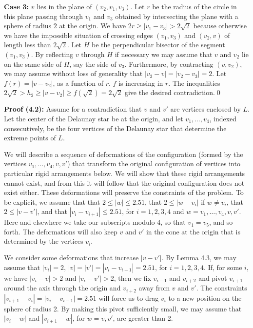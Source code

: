 {\bf Case 3:} $v$ lies in the plane of $(v_2,v_1,v_3)$.
Let $r$ be the radius of the circle in this plane passing
through $v_1$ and $v_3$ obtained by intersecting the plane
with a sphere of radius $2$ at the origin.  
We have $2r\ge|v_1-v_3|>2\sqrt{2}$ because otherwise we have the impossible
situation of crossing edges $(v_1,v_3)$ and
 $(v_2,v)$ of length less than $2\sqrt{2}$.
Let $H$ be the perpendicular bisector of
the segment $(v_1,v_3)$.
By reflecting $v$ through $H$ if necessary
we may assume that $v$ and $v_2$ lie
on the same side of $H$, say the side of $v_3$.  Furthermore,
by contracting $(v,v_2)$, we may assume
without loss of generality 
that $|v_3-v|=|v_2-v_3|=2$.  
Let $f(r)=|v-v_2|$,
as a function of $r$.  $f$ is increasing
in $r$.  The inequalities
$2\sqrt{2}>h_2\ge|v-v_2|\ge f(\sqrt{2})=2\sqrt{2}$
give the desired contradiction.\qed

{\bf Proof (4.2):}
Assume for a contradiction that $v$ and $v'$ are vertices enclosed
by $L$.  Let the center of the Delaunay star be at the origin,
and let $v_1,\ldots, v_4$, indexed
consecutively,  be the four vertices of the Delaunay
star  that determine the extreme points
of  $L$.

We will describe a sequence of
deformations of the configuration 
(formed by the vertices $v_1,\ldots,v_4,v,v'$) that
transform the original configuration of vertices into particular
rigid arrangements below.  We will show that these rigid arrangements
cannot exist, and from this it will follow that the original configuration
does not exist either.
These deformations will preserve the constraints of the problem.
To be explicit, we assume that
that $2\le|w|\le 2.51$,
that $2\le |w-v_i|$ if $w\ne v_i$,
that $2\le |v-v'|$,
and that $|v_i-v_{i+1}|\le 2.51$,
for $i=1,2,3,4$ and $w=v_1,\ldots,v_4,v,v'$.
Here and
elsewhere we take our subscripts modulo 4, so that $v_1=v_5$, and
so forth.  The deformations will also keep $v$ and $v'$
in the cone at the origin that is determined by the
vertices $v_i$.  

We consider some deformations that increase $|v-v'|$.  
By Lemma 4.3, we may assume that
$|v_i|=2$,
$|v|=|v'|=|v_i-v_{i+1}|=2.51$, for $i=1,2,3,4$.
If, for some $i$,
we have $|v_i-v|>2$ and $|v_i-v'|>2$, then we fix $v_{i-1}$ and
$v_{i+2}$ and pivot $v_{i+1}$ around the axis through the origin and $v_{i+2}$
away from $v$ and $v'$.  The constraints $|v_{i+1}-v_i|=|v_i-v_{i-1}|=2.51$
will force us to drag $v_i$ to a new position on the sphere of radius 2.
By
making this pivot sufficiently small, we may assume that $|v_i-w|$ and
$|v_{i+1}-w|$, for $w=v,v'$, are greater than 2.


